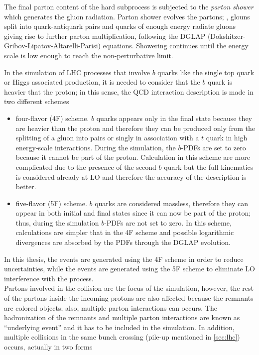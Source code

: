 \noindent The final parton content of the hard subprocess is subjected to the \textit{parton shower} which generates the gluon radiation. Parton shower evolves the partons; \ie, glouns split into quark-antiquark pairs and quarks of enough energy radiate gluons giving rise to further parton multiplication, following the DGLAP (Dokshitzer-Gribov-Lipatov-Altarelli-Parisi) equations. Showering continues until the energy scale is low enough to reach the non-perturbative limit.   

\noindent In the simulation of LHC processes that involve $b$ quarks like the single top quark or Higgs associated production, it is needed to consider that the $b$ quark is heavier that the proton; in this sense, the QCD interaction description is made in two different schemes \cite{schemes}

\begin{itemize}

\item four-flavor (4F) scheme. $b$ quarks appears only in the final state because they are heavier than the proton and therefore they can be produced only from the splitting of a gluon into pairs or singly in association with a $t$ quark in high energy-scale interactions. During the simulation, the $b$-PDFs are set to zero because it cannot be part of the proton. Calculation in this scheme are more complicated due to the presence of the second $b$ quark but the full kinematics is considered already at LO and therefore the accuracy of the description is better.   

\item five-flavor (5F) scheme. $b$ quarks are considered massless, therefore they can appear in both initial and final states since it can now be part of the proton; thus, during the simulation $b$-PDFs are not set to zero. In this scheme, calculations are simpler that in the 4F scheme and possible logarithmic divergences are absorbed by the PDFs through the DGLAP evolution.   
\end{itemize}

\noindent In this thesis, the \tHq events are generated using the 4F scheme in order to reduce uncertainties, while the \tHW events are generated using the 5F scheme to eliminate LO interference with the \ttH process\cite{demartin}.\\    

\noindent Partons involved in the \pp collision are the focus of the simulation, however, the rest of the partons inside the incoming protons are also affected because the remnants are colored objects; also, multiple parton interactions can occurs. The hadronization of the remnants and multiple parton interactions are known as ``underlying event'' and it has to be included in the simulation. In addition, multiple \pp collisions in the same bunch crossing (pile-up mentioned in \ref{sec:lhc}) occurs, actually in two forms

